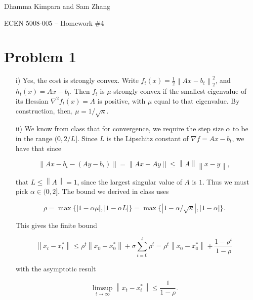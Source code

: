 \documentclass[12pt]{article}
\newcommand{\abs}[1]{\left\lvert#1\right\rvert}
\newcommand{\norm}[1]{\left\lVert#1\right\rVert}
\begin{document}
\begin{flushright}
    Dhamma Kimpara and Sam Zhang

    ECEN 5008-005 -- Homework \#4
\end{flushright}

\section*{Problem 1}%
\label{sec:Problem 1}

\begin{enumerate}
    \item [i)] Yes, the cost is strongly convex. Write $f_t(x) = \frac{1}{2}\norm{Ax - b_t}_2^2$, and $h_t(x) = Ax - b_t$. Then $f_t$ is $\mu$-strongly convex if the smallest eigenvalue of its Hessian $\nabla^2 f_t(x) = A$ is positive, with $\mu$ equal to that eigenvalue. By construction, then, $\mu = 1/\sqrt{\kappa}$.

    \item[ii)] We know from class that for convergence, we require the step size $\alpha$ to be in the range $(0, 2/L]$. Since $L$ is the Lipschitz constant of $\nabla f = Ax - b_t$, we have that since

        \begin{equation*}
            \norm{Ax - b_t - (Ay - b_t)} = \norm{Ax - Ay} \le \norm{A} \norm{x - y},
        \end{equation*}

        that $L \le \norm{A} = 1$, since the largest singular value of $A$ is $1$. Thus we must pick $\alpha \in (0, 2]$. The bound we derived in class uses 

        \begin{equation*}
            \rho = \max \lbrace \abs{ 1 - \alpha \mu}, \abs{ 1 - \alpha L } \rbrace = \max \lbrace \abs{ 1 - \alpha/\sqrt{\kappa}}, \abs{ 1 - \alpha } \rbrace.
        \end{equation*}

        This gives the finite bound

        \begin{equation*}
            \norm{x_t - x_t^*} \le \rho^t \norm{x_0 - x_0^*} + \sigma \sum_{i=0}^t \rho^i = \rho^t \norm{x_0 - x_0^*} + \frac{1 - \rho^{t}}{1-\rho}
        \end{equation*}

        with the asymptotic result

        \begin{equation*}
            \limsup_{t \to \infty} \norm{x_t - x_t^*} \le \frac{1}{1 - \rho}.
        \end{equation*}


\end{enumerate}
\end{document}

